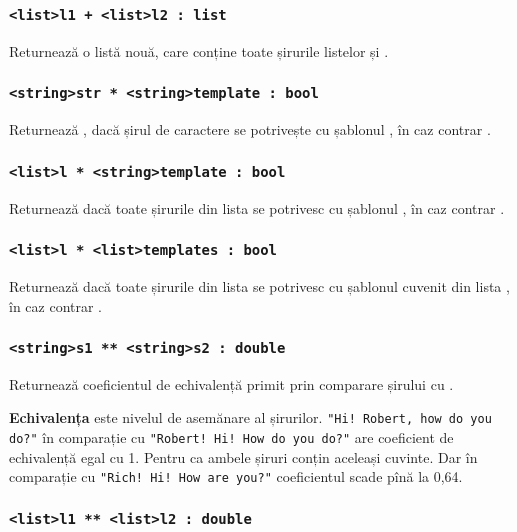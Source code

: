 \subsubsection{\lstinline|<list>l1 + <list>l2 : list|}

Returnează o listă nouă, care conține toate șirurile listelor  și .

\subsubsection{\lstinline|<string>str * <string>template : bool|}

Returnează \true{}, dacă șirul de caractere  se potrivește cu șablonul , în caz contrar \false{}.

\subsubsection{\lstinline|<list>l * <string>template : bool|}

Returnează \true{} dacă toate șirurile din lista  se potrivesc cu șablonul , în caz contrar \false{}.

\subsubsection{\lstinline|<list>l * <list>templates : bool|}

Returnează \true{} dacă toate șirurile din lista  se potrivesc cu șablonul cuvenit din lista , în caz contrar \false{}.

\subsubsection{\lstinline|<string>s1 ** <string>s2 : double|}

Returnează coeficientul de echivalență primit prin comparare șirului  cu .

{\bf Echivalența} este nivelul de asemănare al șirurilor. \lstinline|"Hi! Robert, how do you do?"| în comparație cu \lstinline|"Robert! Hi! How do you do?"| are coeficient de echivalență egal cu 1. Pentru ca ambele șiruri conțin aceleași cuvinte. Dar în comparație cu  \lstinline|"Rich! Hi! How are you?"| coeficientul scade pînă la 0,64.

\subsubsection{\lstinline|<list>l1 ** <list>l2 : double|}


